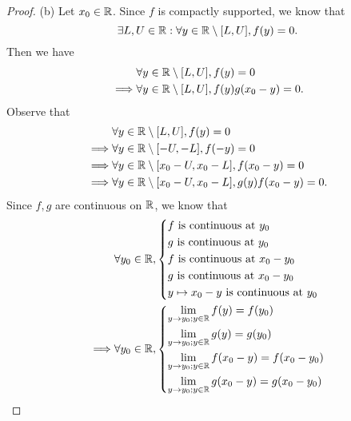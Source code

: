 \begin{proof}{(b)}
  Let \(x_0 \in \mathbb{R}\).
  Since \(f\) is compactly supported, we know that
  \[
    \exists L, U \in \mathbb{R} : \forall y \in \mathbb{R} \setminus [L, U], f(y) = 0.
  \]
  Then we have
  \begin{align*}
             & \forall y \in \mathbb{R} \setminus [L, U], f(y) = 0             \\
    \implies & \forall y \in \mathbb{R} \setminus [L, U], f(y) g(x_0 - y) = 0.
  \end{align*}
  Observe that
  \begin{align*}
             & \forall y \in \mathbb{R} \setminus [L, U], f(y) = 0                         \\
    \implies & \forall y \in \mathbb{R} \setminus [-U, -L], f(-y) = 0                      \\
    \implies & \forall y \in \mathbb{R} \setminus [x_0 - U, x_0 - L], f(x_0 - y) = 0       \\
    \implies & \forall y \in \mathbb{R} \setminus [x_0 - U, x_0 - L], g(y) f(x_0 - y) = 0.
  \end{align*}
  Since \(f, g\) are continuous on \(\mathbb{R}\), we know that
  \begin{align*}
             & \forall y_0 \in \R, \begin{dcases}
                                     f \text{ is continuous at } y_0       \\
                                     g \text{ is continuous at } y_0       \\
                                     f \text{ is continuous at } x_0 - y_0 \\
                                     g \text{ is continuous at } x_0 - y_0 \\
                                     y \mapsto x_0 - y \text{ is continuous at } y_0
                                   \end{dcases}                    \\
    \implies & \forall y_0 \in \R, \begin{dcases}
                                     \lim_{y \to y_0 ; y \in \R} f(y) = f(y_0)             \\
                                     \lim_{y \to y_0 ; y \in \R} g(y) = g(y_0)             \\
                                     \lim_{y \to y_0 ; y \in \R} f(x_0 - y) = f(x_0 - y_0) \\
                                     \lim_{y \to y_0 ; y \in \R} g(x_0 - y) = g(x_0 - y_0)

\end{dcases}
\end{align*}
\end{proof}
